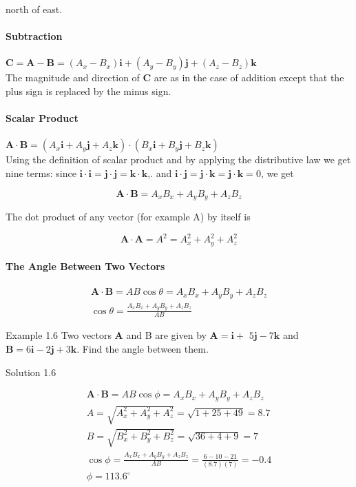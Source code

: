 \documentclass[10pt]{article}
\numberwithin{equation}{section}
\begin{document}
north of east.

\paragraph{Subtraction}\label{sec:1-8-2-2}
$\mathbf{C}=\mathbf{A}-\mathbf{B}=\left(A_{x}-B_{x}\right) \mathbf{i}+\left(A_{y}-B_{y}\right) \mathbf{j}+\left(A_{z}-B_{z}\right) \mathbf{k}$\\
The magnitude and direction of $\mathbf{C}$ are as in the case of addition except that the plus sign is replaced by the minus sign.

\paragraph{Scalar Product}\label{sec:1-8-2-3}
$\mathbf{A} \cdot \mathbf{B}=\left(A_{x} \mathbf{i}+A_{y} \mathbf{j}+A_{z} \mathbf{k}\right) \cdot\left(B_{x} \mathbf{i}+B_{y} \mathbf{j}+B_{z} \mathbf{k}\right)$\\
Using the definition of scalar product and by applying the distributive law we get nine terms: since $\mathbf{i} \cdot \mathbf{i}=\mathbf{j} \cdot \mathbf{j}=\mathbf{k} \cdot \mathbf{k}$,. and $\mathbf{i} \cdot \mathbf{j}=\mathbf{j} \cdot \mathbf{k}=\mathbf{j} \cdot \mathbf{k}=0$, we get

$$
\mathbf{A} \cdot \mathbf{B}=A_{x} B_{x}+A_{y} B_{y}+A_{z} B_{z}
$$

The dot product of any vector (for example A) by itself is

$$
\mathbf{A} \cdot \mathbf{A}=A^{2}=A_{x}^{2}+A_{y}^{2}+A_{z}^{2}
$$

\paragraph{The Angle Between Two Vectors}\label{sec:1-8-2-4}
$$
\begin{gathered}
\mathbf{A} \cdot \mathbf{B}=A B \cos \theta=A_{x} B_{x}+A_{y} B_{y}+A_{z} B_{z} \\
\cos \theta=\frac{A_{x} B_{x}+A_{y} B_{y}+A_{z} B_{z}}{A B}
\end{gathered}
$$

Example 1.6 Two vectors $\mathbf{A}$ and B are given by $\mathbf{A}=\mathbf{i}+$ $5 \mathbf{j}-7 \mathbf{k}$ and $\mathbf{B}=6 \mathbf{i}-2 \mathbf{j}+3 \mathbf{k}$. Find the angle between them.

Solution 1.6

$$
\begin{gathered}
\mathbf{A} \cdot \mathbf{B}=A B \cos \phi=A_{x} B_{x}+A_{y} B_{y}+A_{z} B_{z} \\
A=\sqrt{A_{x}^{2}+A_{y}^{2}+A_{z}^{2}}=\sqrt{1+25+49}=8.7 \\
B=\sqrt{B_{x}^{2}+B_{y}^{2}+B_{z}^{2}}=\sqrt{36+4+9}=7 \\
\cos \phi=\frac{A_{x} B_{x}+A_{y} B_{y}+A_{z} B_{z}}{A B}=\frac{6-10-21}{(8.7)(7)}=-0.4 \\
\phi=113.6^{\circ}
\end{gathered}
$$
\end{document}
